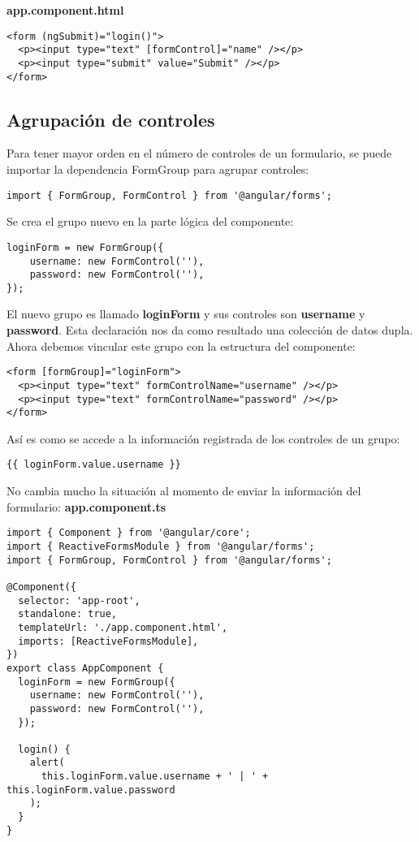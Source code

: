 \textbf{app.component.html}
\begin{lstlisting}[style=htmlcssjs]
<form (ngSubmit)="login()">
  <p><input type="text" [formControl]="name" /></p>
  <p><input type="submit" value="Submit" /></p>
</form>
\end{lstlisting}


\subsection{Agrupación de controles}

Para tener mayor orden en el número de controles de un formulario, se puede importar la dependencia FormGroup para agrupar controles:
\begin{lstlisting}[style=htmlcssjs]
import { FormGroup, FormControl } from '@angular/forms';
\end{lstlisting}

Se crea el grupo nuevo en la parte lógica del componente:
\begin{lstlisting}[style=htmlcssjs]
loginForm = new FormGroup({
    username: new FormControl(''),
    password: new FormControl(''),
});
\end{lstlisting}

El nuevo grupo es llamado \textbf{loginForm} y sus controles son \textbf{username} y \textbf{password}. Esta declaración nos da como resultado una colección de datos dupla. Ahora debemos vincular este grupo con la estructura del componente:
\begin{lstlisting}[style=htmlcssjs]
<form [formGroup]="loginForm">
  <p><input type="text" formControlName="username" /></p>
  <p><input type="text" formControlName="password" /></p>
</form>
\end{lstlisting}

Así es como se accede a la información registrada de los controles de un grupo:
\begin{lstlisting}[style=htmlcssjs]
{{ loginForm.value.username }}
\end{lstlisting}

No cambia mucho la situación al momento de enviar la información del formulario:
\textbf{app.component.ts}
\begin{lstlisting}[style=htmlcssjs]
import { Component } from '@angular/core';
import { ReactiveFormsModule } from '@angular/forms';
import { FormGroup, FormControl } from '@angular/forms';

@Component({
  selector: 'app-root',
  standalone: true,
  templateUrl: './app.component.html',
  imports: [ReactiveFormsModule],
})
export class AppComponent {
  loginForm = new FormGroup({
    username: new FormControl(''),
    password: new FormControl(''),
  });

  login() {
    alert(
      this.loginForm.value.username + ' | ' + this.loginForm.value.password
    );
  }
}
\end{lstlisting}

